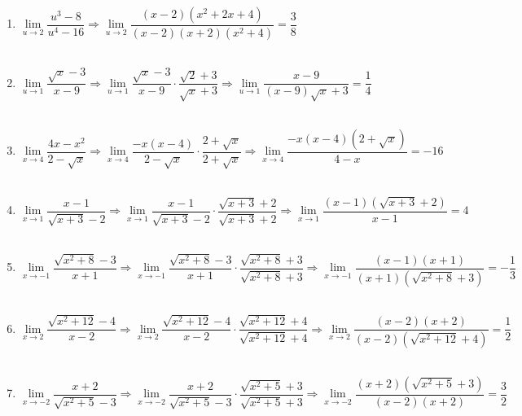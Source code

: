 \begin{enumerate}
\item $\lim\limits_{u\to 2} \dfrac{u^3-8}{u^4-16} \Longrightarrow \lim\limits_{u\to 2} \dfrac{(x-2)(x^2+2x+4)}{(x-2)(x+2)(x^2+4)} = \dfrac{3}{8}$\\\\

\item $\lim\limits_{u\to 1} \dfrac{\sqrt{x}-3}{x-9} \Longrightarrow \lim\limits_{u\to 1}\dfrac{\sqrt{x}-3}{x-9}\cdot \dfrac{\sqrt{2}+3}{\sqrt{x}+3} \Longrightarrow \lim\limits_{u\to 1}\dfrac{x-9}{(x-9)\sqrt{x}+3} = \dfrac{1}{4}$\\\\

\item $\lim\limits_{x\to 4}\dfrac{4x-x^2}{2-\sqrt{x}} \Longrightarrow \lim\limits_{x\to 4}\dfrac{-x(x-4)}{2-\sqrt{x}}\cdot \dfrac{2+\sqrt{x}}{2+\sqrt{x}} \Longrightarrow \lim\limits_{x\to 4} \dfrac{-x(x-4)(2+\sqrt{x})}{4-x} = -16$\\\\

\item $\lim\limits_{x\to 1} \dfrac{x-1}{\sqrt{x+3}-2} \Longrightarrow \lim\limits_{x\to 1} \dfrac{x-1}{\sqrt{x+3}-2} \cdot \dfrac{\sqrt{x+3}+2}{\sqrt{x+3}+2} \Longrightarrow \lim\limits_{x\to 1} \dfrac{(x-1)(\sqrt{x+3}+2)}{x-1} = 4 $\\\\

\item $\lim\limits_{x\to -1} \dfrac{\sqrt{x^2+8}-3}{x+1} \Longrightarrow \lim\limits_{x\to -1} \dfrac{\sqrt{x^2+8}-3}{x+1} \cdot \dfrac{\sqrt{x^2+8}+3}{\sqrt{x^2+8}+3} \Longrightarrow \lim\limits_{x\to -1}\dfrac{(x - 1)(x+1)}{(x+1)(\sqrt{x^2+8}+3)} = -\dfrac{1}{3}$\\\\

\item $\lim\limits_{x\to 2}\dfrac{\sqrt{x^2+12}-4}{x-2} \Longrightarrow \lim\limits_{x\to 2} \dfrac{\sqrt{x^2+12}-4}{x-2} \cdot \dfrac{\sqrt{x^2+12}+4}{\sqrt{x^2+12}+4} \Longrightarrow \lim\limits_{x\to 2} \dfrac{(x-2)(x+2)}{(x-2)(\sqrt{x^2+12}+4)} = \dfrac{1}{2}$\\\\

\item $\lim\limits_{x\to -2} \dfrac{x+2}{\sqrt{x^2+5}-3} \Longrightarrow \lim\limits_{x\to -2} \dfrac{x+2}{\sqrt{x^2+5}-3}\cdot \dfrac{\sqrt{x^2+5}+3}{\sqrt{x^2+5}+3} \Longrightarrow \lim\limits_{x\to -2} \dfrac{(x+2)(\sqrt{x^2+5}+3)}{(x-2)(x+2)} = \dfrac{3}{2}$\\\\


\end{enumerate}
